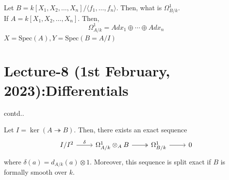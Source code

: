 \documentclass[oneside, 12pt]{scrbook}
\newcommand{\spec}{\mathrm{Spec}}
\theoremstyle{theorem}
\begin{document}
\begin{example}
Let $B = k[X_{1},X_{2}, \hdots , X_{n}]/\langle f_{1}, \hdots , f_{n} \rangle$. Then, what is $\Omega_{B/k}^{1}$. \\

If $A = k[X_{1}, X_{2}, \hdots , X_{n}]$. Then, $$\Omega_{A/k}^{1} = Adx_{1} \oplus \cdots \oplus Adx_{n}$$ 
$X= \spec(A), Y = \spec(B = A/I)$
\end{example}


\chapter{Lecture-8 (1st February, 2023):Differentials}

contd..
\begin{theorem}
Let $I = \ker(A \twoheadrightarrow B)$. Then, there exists an exact sequence \[\begin{tikzcd}
	{I/I^2} & {\Omega_{A/k}^{1} \otimes_{A} B} & {\Omega_{B/k}^{1}} & 0
	\arrow[two heads, from=1-2, to=1-3]
	\arrow["\delta", from=1-1, to=1-2]
	\arrow[from=1-3, to=1-4]
\end{tikzcd}\] where $\delta(a) = d_{A/k} (a) \otimes 1$. Moreover, this sequence is split exact if $B$ is formally smooth over $k$.
\end{theorem}
\end{document}
